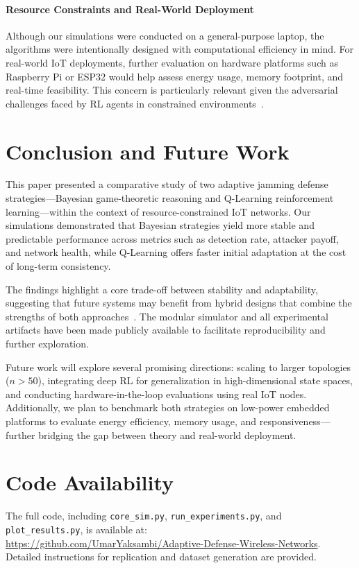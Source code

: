 \documentclass[conference]{IEEEtran}
\begin{document}
\paragraph{Resource Constraints and Real-World Deployment}

Although our simulations were conducted on a general-purpose laptop, the algorithms were intentionally designed with computational efficiency in mind. For real-world IoT deployments, further evaluation on hardware platforms such as Raspberry Pi or ESP32 would help assess energy usage, memory footprint, and real-time feasibility. This concern is particularly relevant given the adversarial challenges faced by RL agents in constrained environments~\cite{wang2023adversarial}.

\section{Conclusion and Future Work}

This paper presented a comparative study of two adaptive jamming defense strategies—Bayesian game-theoretic reasoning and Q-Learning reinforcement learning—within the context of resource-constrained IoT networks. Our simulations demonstrated that Bayesian strategies yield more stable and predictable performance across metrics such as detection rate, attacker payoff, and network health, while Q-Learning offers faster initial adaptation at the cost of long-term consistency.

The findings highlight a core trade-off between stability and adaptability, suggesting that future systems may benefit from hybrid designs that combine the strengths of both approaches~\cite{khoury2020hybrid}. The modular simulator and all experimental artifacts have been made publicly available to facilitate reproducibility and further exploration.

Future work will explore several promising directions: scaling to larger topologies ($n > 50$), integrating deep RL for generalization in high-dimensional state spaces, and conducting hardware-in-the-loop evaluations using real IoT nodes. Additionally, we plan to benchmark both strategies on low-power embedded platforms to evaluate energy efficiency, memory usage, and responsiveness—further bridging the gap between theory and real-world deployment.

\section*{Code Availability}
The full code, including \texttt{core\_sim.py}, \texttt{run\_experiments.py}, and \texttt{plot\_results.py}, is available at:\\
\url{https://github.com/UmarYaksambi/Adaptive-Defense-Wireless-Networks}. Detailed instructions for replication and dataset generation are provided.
\end{document}
